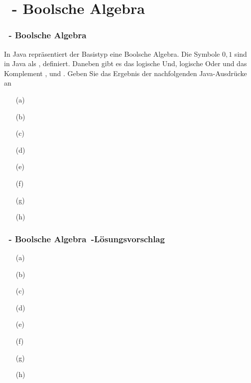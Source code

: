 \def\stitle{\theexercise\ - Boolsche Algebra}
\section{\stitle}
\begin{frame}[t]
  \frametitle{\stitle}


In Java repräsentiert der Basistyp  eine Boolsche Algebra.
Die Symbole $0, 1$ sind in Java als ,  definiert.
Daneben gibt es das logische Und, logische Oder und das Komplement \code{\&\&}, \code{||} und \code{!}.
Geben Sie das Ergebnis der nachfolgenden Java-Ausdrücke an
\medskip

\begin{minipage}{0.49\textwidth}
\begin{itemize}
\item[(a)] 
\item[(b)] 
\item[(c)] 
\item[(d)] 
\end{itemize}
\end{minipage}
\begin{minipage}{0.49\textwidth}
\begin{itemize}
\item[(e)] 
\item[(f)] 
\item[(g)] 
\item[(h)] 
\end{itemize}
\end{minipage}
\end{frame}

\begin{frame}[t]
  \frametitle{\stitle\ -L\"osungsvorschlag}
\begin{center}
\begin{minipage}{0.49\textwidth}
\begin{itemize}
\item[(a)] 
\item[(b)] 
\item[(c)] 
\item[(d)] 
\end{itemize}
\end{minipage}
\begin{minipage}{0.49\textwidth}
\begin{itemize}
\item[(e)] 
\item[(f)] 
\item[(g)] 
\item[(h)] 
\end{itemize}
\end{minipage}
\end{center}

\end{frame}
